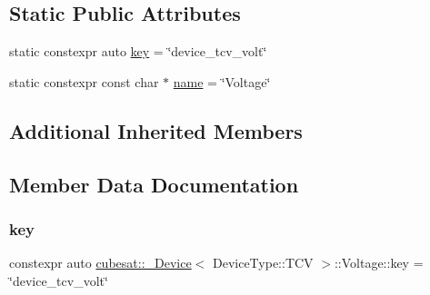 \subsection*{Static Public Attributes}
\begin{DoxyCompactItemize}
\item 
static constexpr auto \hyperlink{structcubesat_1_1__Device_3_01DeviceType_1_1TCV_01_4_1_1Voltage_a931b2a040a3db62e04180c59eaf4060b}{key} = \char`\"{}device\+\_\+tcv\+\_\+volt\char`\"{}
\item 
static constexpr const char $\ast$ \hyperlink{structcubesat_1_1__Device_3_01DeviceType_1_1TCV_01_4_1_1Voltage_a2656ca930878b98e5067ada0ef008efa}{name} = \char`\"{}Voltage\char`\"{}
\end{DoxyCompactItemize}
\subsection*{Additional Inherited Members}


\subsection{Member Data Documentation}
\mbox{\label{structcubesat_1_1__Device_3_01DeviceType_1_1TCV_01_4_1_1Voltage_a931b2a040a3db62e04180c59eaf4060b}} 
\subsubsection{\texorpdfstring{key}{key}}
{\footnotesize\ttfamily constexpr auto \hyperlink{structcubesat_1_1__Device}{cubesat\+::\+\_\+\+Device}$<$ Device\+Type\+::\+T\+CV $>$\+::Voltage\+::key = \char`\"{}device\+\_\+tcv\+\_\+volt\char`\"{}\hspace{0.3cm}{\ttfamily [static]}}

\mbox{\label{structcubesat_1_1__Device_3_01DeviceType_1_1TCV_01_4_1_1Voltage_a2656ca930878b98e5067ada0ef008efa}} 
